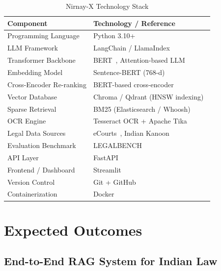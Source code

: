\documentclass[12pt,a4paper]{article}
\begin{document}
\begin{table}[H]
\centering
\caption{Nirnay-X Technology Stack}
\label{tab:techstack}
\begin{tabularx}{\textwidth}{lX}
\toprule
\textbf{Component}        & \textbf{Technology / Reference} \\
\midrule
Programming Language      & Python 3.10+ \\
LLM Framework             & LangChain / LlamaIndex~\cite{lewis2020rag} \\
Transformer Backbone      & BERT~\cite{devlin2019bert}, Attention-based LLM~\cite{vaswani2017attention} \\
Embedding Model           & Sentence-BERT (768-d)~\cite{reimers2019sbert} \\
Cross-Encoder Re-ranking  & BERT-based cross-encoder~\cite{devlin2019bert} \\
Vector Database           & Chroma / Qdrant (HNSW indexing)~\cite{manning2008ir} \\
Sparse Retrieval          & BM25 (Elasticsearch / Whoosh)~\cite{manning2008ir} \\
OCR Engine                & Tesseract OCR + Apache Tika \\
Legal Data Sources        & eCourts~\cite{ecourts}, Indian Kanoon~\cite{indiankanoon} \\
Evaluation Benchmark      & LEGALBENCH~\cite{guha2023legalbench} \\
API Layer                 & FastAPI \\
Frontend / Dashboard      & Streamlit \\
Version Control           & Git + GitHub \\
Containerization          & Docker \\
\bottomrule
\end{tabularx}
\end{table}

\section{Expected Outcomes}

\subsection{End-to-End RAG System for Indian Law}
\end{document}
